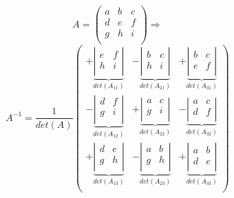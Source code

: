 \[A=\begin{pmatrix} 
	a & b & c \\
	d & e & f \\
	g & h & i \\
\end{pmatrix}  \Rightarrow \] \[A^{-1} = \frac{1}{det(A)}
\begin{pmatrix} 
	+\underbrace{\left|\begin{array}{rr} e & f \\ h & i \\ \end{array}\right|}_{det(A_{11})} &
	-\underbrace{\left|\begin{array}{rr} b & c \\ h & i \\ \end{array}\right|}_{det(A_{21})} &
	+\underbrace{\left|\begin{array}{rr} b & c \\ e & f \\ \end{array}\right|}_{det(A_{31})} \\
	
	-\underbrace{\left|\begin{array}{rr} d & f \\ g & i \\ \end{array}\right|}_{det(A_{12})} &
	+\underbrace{\left|\begin{array}{rr} a & c \\ g & i \\ \end{array}\right|}_{det(A_{22})} &
	-\underbrace{\left|\begin{array}{rr} a & c \\ d & f \\ \end{array}\right|}_{det(A_{32})} \\
	
	+\underbrace{\left|\begin{array}{rr} d & e \\ g & h \\ \end{array}\right|}_{det(A_{13})} &
	-\underbrace{\left|\begin{array}{rr} a & b \\ g & h \\ \end{array}\right|}_{det(A_{23})} &
	+\underbrace{\left|\begin{array}{rr} a & b \\ d & e \\ \end{array}\right|}_{det(A_{33})} \\
\end{pmatrix}\]
\clearpage

